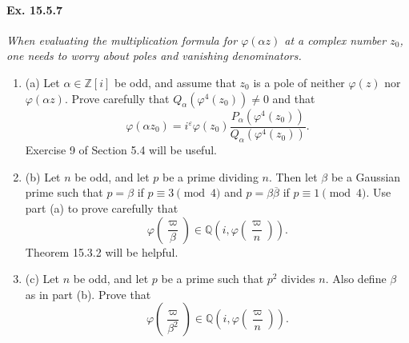 \documentclass[11pt,a4paper]{article}
\newcommand{\be} {\begin{enumerate}}
\newcommand{\ee} {\end{enumerate}}
\newcommand{\Q}{\mathbb{Q}}
\newcommand{\Z}{\mathbb{Z}}
\begin{document}
\paragraph{Ex. 15.5.7}{\it When evaluating the multiplication formula for $\varphi(\alpha z)$ at a complex number $z_0$, one needs to worry about poles and vanishing denominators.
\be
\item[(a)] Let $\alpha \in \Z[i]$ be odd, and assume that $z_0$ is a pole of neither $\varphi(z)$ nor $\varphi(\alpha z)$. Prove carefully that $Q_\alpha(\varphi^4(z_0))\ne 0$ and that
$$
\varphi(\alpha z_0) = i^\varepsilon \varphi(z_0) \frac{P_\alpha(\varphi^4(z_0))}{Q_\alpha(\varphi^4(z_0))}.
$$
Exercise 9 of Section 5.4 will be useful.
\item[(b)] Let $n$ be odd, and let $p$ be a prime dividing $n$. Then let $\beta$ be a Gaussian prime such that $p=\beta$ if $p \equiv 3 \pmod 4$ and $p = \beta \overline{\beta}$ if $p\equiv 1 \pmod 4$. Use part (a) to prove carefully that
$$
\varphi \left(  \frac{\varpi}{\beta} \right) \in \Q \left( i , \varphi \left(\frac{\varpi}{n} \right) \right).
$$ 
Theorem 15.3.2 will be helpful.

\item[(c)] Let $n$ be odd, and let $p$ be a prime such that $p^2$ divides $n$. Also define $\beta$ as in part (b). Prove that
$$
\varphi \left(  \frac{\varpi}{\beta^2} \right) \in \Q \left( i , \varphi \left(\frac{\varpi}{n} \right) \right).
$$
\ee
}
\end{document}
